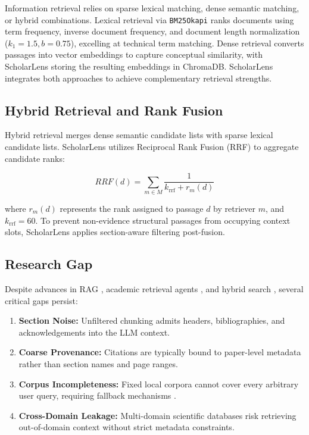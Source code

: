\documentclass[conference]{IEEEtran}
\begin{document}
Information retrieval relies on sparse lexical matching, dense semantic matching, or hybrid combinations. Lexical retrieval via \texttt{BM25Okapi} \cite{robertson2009bm25} ranks documents using term frequency, inverse document frequency, and document length normalization ($k_1=1.5, b=0.75$), excelling at technical term matching. Dense retrieval converts passages into vector embeddings \cite{karpukhin2020dense} to capture conceptual similarity, with ScholarLens storing the resulting embeddings in ChromaDB. ScholarLens integrates both approaches to achieve complementary retrieval strengths.

\subsection{Hybrid Retrieval and Rank Fusion}

Hybrid retrieval merges dense semantic candidate lists with sparse lexical candidate lists. ScholarLens utilizes Reciprocal Rank Fusion (RRF) \cite{cormack2009rrf} to aggregate candidate ranks:

\begin{equation}
RRF(d) = \sum_{m \in M} \frac{1}{k_{\text{rrf}} + r_m(d)}
\end{equation}

where $r_m(d)$ represents the rank assigned to passage $d$ by retriever $m$, and $k_{\text{rrf}}=60$. To prevent non-evidence structural passages from occupying context slots, ScholarLens applies section-aware filtering post-fusion.

\subsection{Research Gap}

Despite advances in RAG \cite{lewis2020retrieval}, academic retrieval agents \cite{lala2023paperqa, asai2026openscholar}, and hybrid search \cite{thakur2021beir}, several critical gaps persist:

\begin{enumerate}
    \item \textbf{Section Noise:} Unfiltered chunking admits headers, bibliographies, and acknowledgements into the LLM context.
    \item \textbf{Coarse Provenance:} Citations are typically bound to paper-level metadata rather than section names and page ranges.
    \item \textbf{Corpus Incompleteness:} Fixed local corpora cannot cover every arbitrary user query, requiring fallback mechanisms \cite{jiang2023flare, yao2023react}.
    \item \textbf{Cross-Domain Leakage:} Multi-domain scientific databases risk retrieving out-of-domain context without strict metadata constraints.
\end{enumerate}
\end{document}
